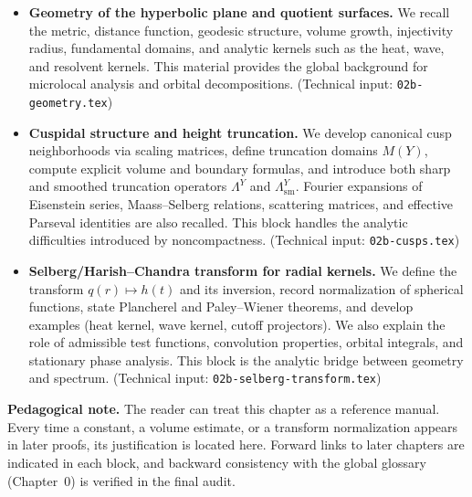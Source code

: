 \begin{itemize}[leftmargin=2em]
  \item \textbf{Geometry of the hyperbolic plane and quotient surfaces.}  
  We recall the metric, distance function, geodesic structure, 
  volume growth, injectivity radius, fundamental domains,  
  and analytic kernels such as the heat, wave, and resolvent kernels.  
  This material provides the global background for microlocal analysis 
  and orbital decompositions.  
  (Technical input: \texttt{02b-geometry.tex})

  \item \textbf{Cuspidal structure and height truncation.}  
  We develop canonical cusp neighborhoods via scaling matrices, 
  define truncation domains $M(Y)$, compute explicit volume and boundary formulas, 
  and introduce both sharp and smoothed truncation operators $\Lambda^{Y}$ and $\Lambda^{Y}_{\mathrm{sm}}$.  
  Fourier expansions of Eisenstein series, Maass–Selberg relations, 
  scattering matrices, and effective Parseval identities are also recalled.  
  This block handles the analytic difficulties introduced by noncompactness.  
  (Technical input: \texttt{02b-cusps.tex})

  \item \textbf{Selberg/Harish–Chandra transform for radial kernels.}  
  We define the transform $q(r) \mapsto h(t)$ and its inversion, 
  record normalization of spherical functions,  
  state Plancherel and Paley–Wiener theorems, and develop examples 
  (heat kernel, wave kernel, cutoff projectors).  
  We also explain the role of admissible test functions, 
  convolution properties, orbital integrals, and stationary phase analysis.  
  This block is the analytic bridge between geometry and spectrum.  
  (Technical input: \texttt{02b-selberg-transform.tex})
\end{itemize}

\medskip

\noindent
\textbf{Pedagogical note.}  
The reader can treat this chapter as a reference manual.  
Every time a constant, a volume estimate, or a transform normalization appears in later proofs, 
its justification is located here.  
Forward links to later chapters are indicated in each block, 
and backward consistency with the global glossary (Chapter~0) is verified in the final audit.

\medskip


